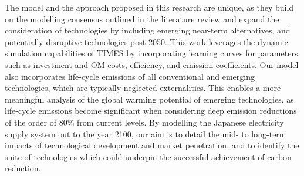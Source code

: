 The model and the approach proposed in this research are unique, as they build on the modelling consensus outlined in the literature review and expand the consideration of technologies by including emerging near-term alternatives, and potentially disruptive technologies post-2050. This work leverages the dynamic simulation capabilities of \gls{TIMES} \cite{loulou_etsap-tiam_2008} by incorporating learning curves for parameters such as investment and \gls{OM} costs, efficiency, and emission coefficients. Our model also incorporates life-cycle emissions of all conventional and emerging technologies, which are typically neglected externalities. This enables a more meaningful analysis of the global warming potential of emerging technologies, as life-cycle emissions become significant when considering deep emission reductions of the order of 80\% from current levels. By modelling the Japanese electricity supply system out to the year 2100, our aim is to detail the mid- to long-term impacts of technological development and market penetration, and to identify the suite of technologies which could underpin the successful achievement of carbon reduction.
